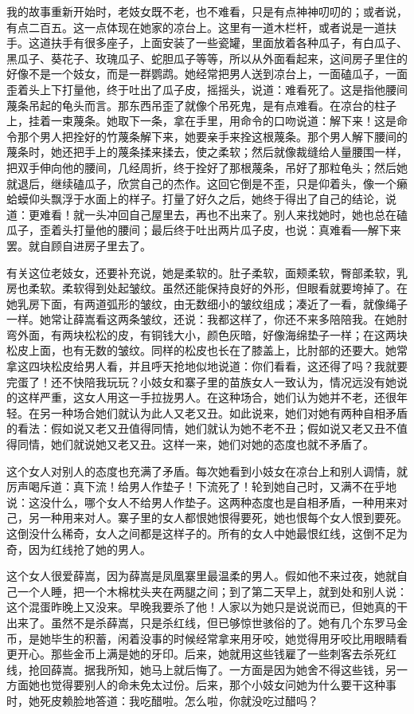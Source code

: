 我的故事重新开始时，老妓女既不老，也不难看，只是有点神神叨叨的；或者说，有点二百五。这一点体现在她家的凉台上。这里有一道木栏杆，或者说是一道扶手。这道扶手有很多座子，上面安装了一些瓷罐，里面放着各种瓜子，有白瓜子、黑瓜子、葵花子、玫瑰瓜子、蛇胆瓜子等等，所以从外面看起来，这间房子里住的好像不是一个妓女，而是一群鹦鹉。她经常把男人送到凉台上，一面磕瓜子，一面歪着头上下打量他，终于吐出了瓜子皮，摇摇头，说道：难看死了。这是指他腰间蔑条吊起的龟头而言。那东西吊歪了就像个吊死鬼，是有点难看。在凉台的柱子上，挂着一束蔑条。她取下一条，拿在手里，用命令的口吻说道：解下来！这是命令那个男人把拴好的竹蔑条解下来，她要亲手来拴这根蔑条。那个男人解下腰间的蔑条时，她还把手上的蔑条揉来揉去，使之柔软；然后就像裁缝给人量腰围一样，把双手伸向他的腰间，几经周折，终于拴好了那根蔑条，吊好了那粒龟头；然后她就退后，继续磕瓜子，欣赏自己的杰作。这回它倒是不歪，只是仰着头，像一个癞蛤蟆仰头飘浮于水面上的样子。打量了好久之后，她终于得出了自己的结论，说道：更难看！就一头冲回自己屋里去，再也不出来了。别人来找她时，她也总在磕瓜子，歪着头打量他的腰间；最后终于吐出两片瓜子皮，也说：真难看──解下来罢。就自顾自进房子里去了。 

有关这位老妓女，还要补充说，她是柔软的。肚子柔软，面颊柔软，臀部柔软，乳房也柔软。柔软得到处起皱纹。虽然还能保持良好的外形，但眼看就要垮掉了。在她乳房下面，有两道弧形的皱纹，由无数细小的皱纹组成；凑近了一看，就像绳子一样。她常让薛嵩看这两条皱纹，还说：我都这样了，你还不来多陪陪我。在她肘弯外面，有两块松松的皮，有铜钱大小，颜色灰暗，好像海绵垫子一样；在这两块松皮上面，也有无数的皱纹。同样的松皮也长在了膝盖上，比肘部的还要大。她常拿这四块松皮给男人看，并且呼天抢地似地说道：你们看看，这还得了吗？我就要完蛋了！还不快陪我玩玩？小妓女和寨子里的苗族女人一致认为，情况远没有她说的这样严重，这女人用这一手拉拢男人。在这种场合，她们认为她并不老，还很年轻。在另一种场合她们就认为此人又老又丑。如此说来，她们对她有两种自相矛盾的看法：假如说又老又丑值得同情，她们就认为她不老不丑；假如说又老又丑不值得同情，她们就说她又老又丑。这样一来，她们对她的态度也就不矛盾了。 

这个女人对别人的态度也充满了矛盾。每次她看到小妓女在凉台上和别人调情，就厉声喝斥道：真下流！给男人作垫子！下流死了！轮到她自己时，又满不在乎地说：这没什么，哪个女人不给男人作垫子。这两种态度也是自相矛盾，一种用来对己，另一种用来对人。寨子里的女人都恨她恨得要死，她也恨每个女人恨到要死。这倒没什么稀奇，女人之间都是这样子的。所有的女人中她最恨红线，这倒不足为奇，因为红线抢了她的男人。 

这个女人很爱薛嵩，因为薛嵩是凤凰寨里最温柔的男人。假如他不来过夜，她就自己一个人睡，把一个木棉枕头夹在两腿之间；到了第二天早上，就到处和别人说：这个混蛋昨晚上又没来。早晚我要杀了他！人家以为她只是说说而已，但她真的干出来了。虽然不是杀薛嵩，只是杀红线，但已够惊世骇俗的了。她有几个东罗马金币，是她毕生的积蓄，闲着没事的时候经常拿来用牙咬，她觉得用牙咬比用眼睛看更开心。那些金币上满是她的牙印。后来，她就用这些钱雇了一些刺客去杀死红线，抢回薛嵩。据我所知，她马上就后悔了。一方面是因为她舍不得这些钱，另一方面她也觉得要别人的命未免太过份。后来，那个小妓女问她为什么要干这种事时，她死皮赖脸地答道：我吃醋啦。怎么啦，你就没吃过醋吗？ 

